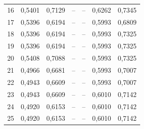 \begin{table}[htbp]
\begin{tabular}{rrrrrrr}
16 & 0,5401 & 0,7129 & -- & -- & 0,6262 & 0,7345 \\
17 & 0,5396 & 0,6194 & -- & -- & 0,5993 & 0,6809 \\
18 & 0,5396 & 0,6194 & -- & -- & 0,5993 & 0,7325 \\
19 & 0,5396 & 0,6194 & -- & -- & 0,5993 & 0,7325 \\
20 & 0,5408 & 0,7088 & -- & -- & 0,5993 & 0,7325 \\
21 & 0,4966 & 0,6681 & -- & -- & 0,5993 & 0,7007 \\
22 & 0,4943 & 0,6609 & -- & -- & 0,5993 & 0,7007 \\
23 & 0,4943 & 0,6609 & -- & -- & 0,6010 & 0,7142 \\
24 & 0,4920 & 0,6153 & -- & -- & 0,6010 & 0,7142 \\
25 & 0,4920 & 0,6153 & -- & -- & 0,6010 & 0,7142 \\
\bottomrule
\end{tabular}
\end{table}

\clearpage
